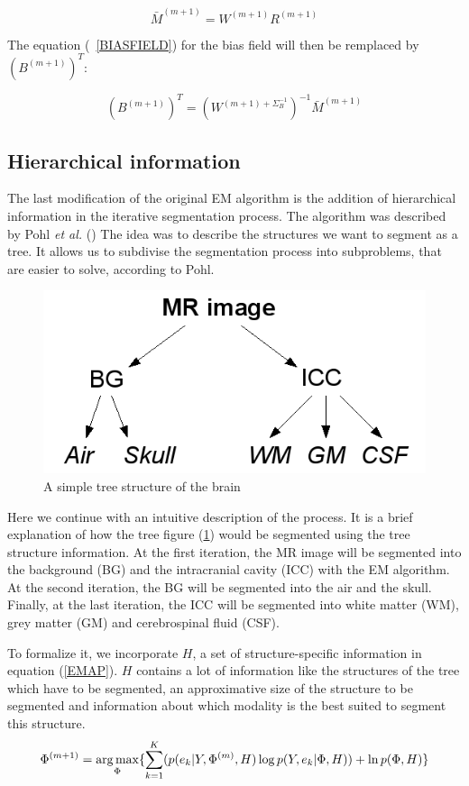   \begin{equation*}
  \bar{M}^{(m+1)} = W^{(m+1)}R^{(m+1)}
  \end{equation*}

The equation (~\ref{BIASFIELD}) for the bias field will then be remplaced by $(B^{(m+1)})^T$:

  \begin{equation*}
  (B^{(m+1)})^T = (W^{(m+1) + \Sigma_B^{-1}})^{-1}\bar{M}^{(m+1)}
  \end{equation*}

%
\subsection{Hierarchical information}\label{Structure}
The last modification of the original EM algorithm is the addition of hierarchical information in the iterative segmentation process. The algorithm was described by Pohl \textit{et al.} (\cite{11}) The idea was to describe the structures we want to segment as a tree. It allows us to subdivise the segmentation process into subproblems, that are easier to solve, according to Pohl.
  
  \begin{figure}[ht]\centering
  \includegraphics[width=.5\textwidth]{Images/Graphics/treeStructure.png}
  \caption{A simple tree structure of the brain}\label{fig:treeStructure}
  \end{figure}
  
Here we continue with an intuitive description of the process. It is a brief explanation of how the tree figure (\ref{fig:treeStructure}) would be segmented using the tree structure information. At the first iteration, the MR image will be segmented into the background (BG) and the intracranial cavity (ICC) with the EM algorithm. At the second iteration, the BG will be segmented into the air and the skull. Finally, at the last iteration, the ICC will be segmented into white matter (WM), grey matter (GM) and cerebrospinal fluid (CSF).

To formalize it, we incorporate $H$, a set of structure-specific information in equation (\ref{EMAP}). $H$ contains a lot of information like the structures of the tree which have to be segmented, an approximative size of the structure to be segmented and information about which modality is the best suited to segment this structure.
\begin{equation*}
 \Phi^{(m+1)}=\operatorname*{arg\,max}_\Phi \{\sum_{k=1}^K   (p(e_{k}|Y,\Phi^{(m)},H)\operatorname*{log} p(Y,e_{k}|\Phi,H)) + \operatorname*{ln} p(\Phi ,H) \} \\
\end{equation*}
 

